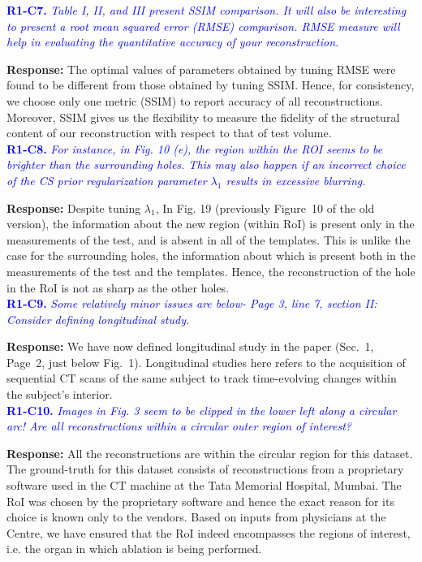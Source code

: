 \documentclass{article}
\begin{document}
\textcolor{blue}{\textbf{R1-C7.}\textit{ Table I, II, and III present SSIM comparison. It will also be interesting to present a root mean squared error (RMSE) comparison. RMSE measure will help in evaluating the quantitative accuracy of your reconstruction.}}

\textbf{Response:} The optimal values of parameters obtained by tuning RMSE were found to be different from those obtained by tuning SSIM. Hence, for consistency, we choose only one metric (SSIM) to report accuracy of all reconstructions.
Moreover, SSIM gives us the flexibility to measure the fidelity of the structural content of our reconstruction with respect to that of test volume.\\ 

\textcolor{blue}{\textbf{R1-C8.}\textit{ For instance, in Fig. 10 (e), the region within the ROI seems to be brighter than the surrounding holes. This may also happen if an incorrect choice of the CS prior regularization parameter $\lambda_1$ results in excessive blurring.}}
  
\textbf{Response:} Despite tuning $\lambda_1$, In Fig. 19 (previously Figure~10 of the old version), the information about the new region (within RoI)  is present only in the measurements of the test, and is absent in all of the templates. This is unlike the case for the surrounding holes, the information about which is present both in the measurements of the test and the templates. Hence, the reconstruction of the hole in the RoI is not as sharp as the other holes.\\

\textcolor{blue}{\textbf{R1-C9.}\textit{ Some relatively minor issues are below- Page 3, line 7, section II: Consider defining longitudinal study.}}
  
\textbf{Response:} We have now defined longitudinal study in the paper (Sec.~1, Page~2, just below Fig.~1). Longitudinal studies here refers to the acquisition of sequential CT scans of the same subject to track time-evolving changes within the subject's interior.  \\

\textcolor{blue}{\textbf{R1-C10.} \textit{ Images in Fig. 3 seem to be clipped in the lower left along a circular arc! Are all reconstructions within a circular outer region of interest?}}

\textbf{Response:} All the reconstructions are within the circular region for this dataset. The ground-truth for this dataset consists of reconstructions from a proprietary software used in the CT machine at the Tata Memorial Hospital, Mumbai. The  RoI was chosen by the proprietary software and hence the exact reason for its choice is known only to the vendors. Based on inputs from physicians at the Centre, we have ensured that the RoI indeed encompasses the regions of interest, i.e. the organ in which ablation is being performed.\\
\end{document}
